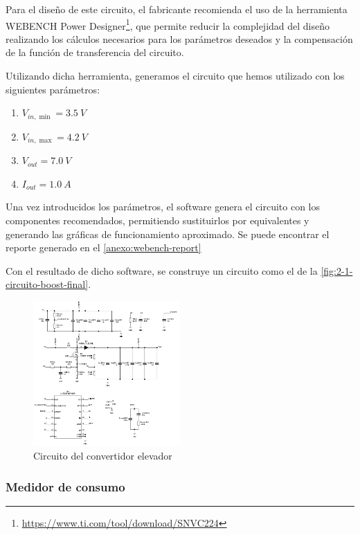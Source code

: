 Para el diseño de este circuito, el fabricante recomienda el uso de la herramienta WEBENCH Power Designer\footnote{\url{https://www.ti.com/tool/download/SNVC224}}, que permite reducir la complejidad del diseño realizando los cálculos necesarios para los parámetros deseados y la compensación de la función de transferencia del circuito. 

Utilizando dicha herramienta, generamos el circuito que hemos utilizado con los siguientes parámetros: 
\begin{enumerate}
    \item $V_{in, \min} = 3.5\ V$
    \item $V_{in, \max} = 4.2\ V$
    \item $V_{out} = 7.0\ V$
    \item $I_{out} = 1.0\ A$
\end{enumerate}

Una vez introducidos los parámetros, el software genera el circuito con los componentes recomendados, permitiendo sustituirlos por equivalentes y generando las gráficas de funcionamiento aproximado. Se puede encontrar el reporte generado en el \autoref{anexo:webench-report}

Con el resultado de dicho software, se construye un circuito como el de la \autoref{fig:2-1-circuito-boost-final}.

\begin{figure}[h]
    \centering
    \includegraphics[width=0.5\textwidth]{images/2/2-1/circuitoElevador.png}
    \caption{Circuito del convertidor elevador}
    \label{fig:2-1-circuito-boost-final}
\end{figure}

\subsubsection{Medidor de consumo}


